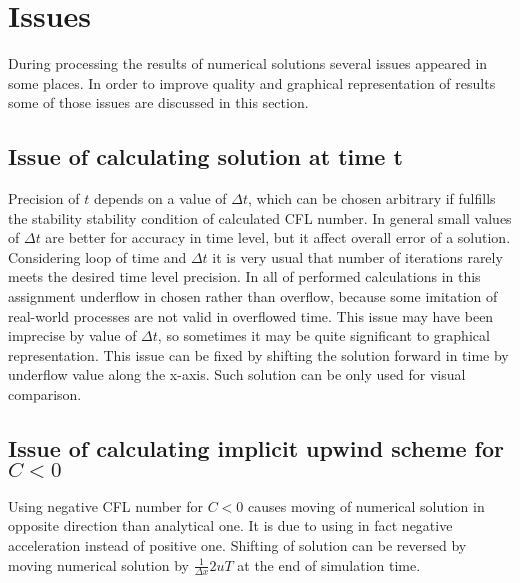 \section{Issues} \label{app:issues}
	During processing the results of numerical solutions several issues appeared in some places. In order to improve quality and graphical representation of results some of those issues are discussed in this section.
	
	\subsection{Issue of calculating solution at time t}
		Precision of $t$ depends on a value of $\Delta t$, which can be chosen arbitrary if fulfills the stability stability condition of calculated CFL number. In general small values of $\Delta t$ are better for accuracy in time level, but it affect overall error of a solution. Considering loop of time and $\Delta t$ it is very usual that number of iterations rarely meets the desired time level precision. In all of performed calculations in this assignment underflow in chosen rather than overflow, because some imitation of real-world processes are not valid in overflowed time. This issue may have been imprecise by value of $\Delta t$, so sometimes it may be quite significant to graphical representation. This issue can be fixed by shifting the solution forward in time by underflow value along the x-axis. Such solution can be only used for visual comparison.
		
	\subsection{Issue of calculating implicit upwind scheme for $C<0$}
		Using negative CFL number for $C<0$ causes moving of numerical solution in opposite direction than analytical one. It is due to using in fact negative acceleration instead of positive one. Shifting of solution can be reversed by moving numerical solution by $\frac{1}{\Delta x}2uT $ at the end of simulation time.  
\clearpage